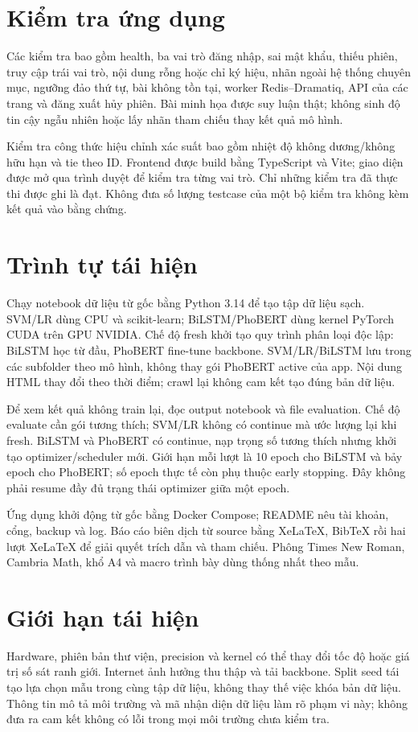 \section{Kiểm tra ứng dụng}
Các kiểm tra bao gồm health, ba vai trò đăng nhập, sai mật khẩu, thiếu phiên, truy cập trái vai trò, nội dung rỗng hoặc chỉ ký hiệu, nhãn ngoài hệ thống chuyên mục, ngưỡng đảo thứ tự, bài không tồn tại, worker Redis--Dramatiq, API của các trang và đăng xuất hủy phiên. Bài minh họa được suy luận thật; không sinh độ tin cậy ngẫu nhiên hoặc lấy nhãn tham chiếu thay kết quả mô hình.

Kiểm tra công thức hiệu chỉnh xác suất bao gồm nhiệt độ không dương/không hữu hạn và tie theo ID. Frontend được build bằng TypeScript và Vite; giao diện được mở qua trình duyệt để kiểm tra từng vai trò. Chỉ những kiểm tra đã thực thi được ghi là đạt. Không đưa số lượng testcase của một bộ kiểm tra không kèm kết quả vào bằng chứng.

\section{Trình tự tái hiện}
Chạy notebook dữ liệu từ gốc bằng Python 3.14 để tạo tập dữ liệu sạch. SVM/LR dùng CPU và scikit-learn; BiLSTM/PhoBERT dùng kernel PyTorch CUDA trên GPU NVIDIA. Chế độ fresh khởi tạo quy trình phân loại độc lập: BiLSTM học từ đầu, PhoBERT fine-tune backbone. SVM/LR/BiLSTM lưu trong các subfolder theo mô hình, không thay gói PhoBERT active của app. Nội dung HTML thay đổi theo thời điểm; crawl lại không cam kết tạo đúng bản dữ liệu.

Để xem kết quả không train lại, đọc output notebook và file evaluation. Chế độ evaluate cần gói tương thích; SVM/LR không có continue mà ước lượng lại khi fresh. BiLSTM và PhoBERT có continue, nạp trọng số tương thích nhưng khởi tạo optimizer/scheduler mới. Giới hạn mỗi lượt là 10 epoch cho BiLSTM và bảy epoch cho PhoBERT; số epoch thực tế còn phụ thuộc early stopping. Đây không phải resume đầy đủ trạng thái optimizer giữa một epoch.

Ứng dụng khởi động từ gốc bằng Docker Compose; README nêu tài khoản, cổng, backup và log. Báo cáo biên dịch từ source bằng XeLaTeX, BibTeX rồi hai lượt XeLaTeX để giải quyết trích dẫn và tham chiếu. Phông Times New Roman, Cambria Math, khổ A4 và macro trình bày dùng thống nhất theo mẫu.

\section{Giới hạn tái hiện}
Hardware, phiên bản thư viện, precision và kernel có thể thay đổi tốc độ hoặc giá trị số sát ranh giới. Internet ảnh hưởng thu thập và tải backbone. Split seed tái tạo lựa chọn mẫu trong cùng tập dữ liệu, không thay thế việc khóa bản dữ liệu. Thông tin mô tả môi trường và mã nhận diện dữ liệu làm rõ phạm vi này; không đưa ra cam kết không có lỗi trong mọi môi trường chưa kiểm tra.
